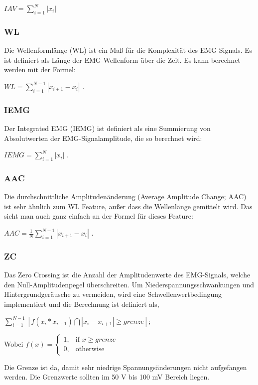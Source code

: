 $ IAV =  \sum_{i=1}^{N} \left | x_{i} \right | $ 

\subsubsection{WL}
Die Wellenformlänge (WL) ist ein Maß für die Komplexität des EMG Signals.
Es ist definiert als  Länge der EMG-Wellenform über die Zeit.
Es kann berechnet werden mit der Formel: 
 
 $WL =  \sum_{i=1}^{N-1}  \left | x_{i+1}-x_{i}  \right | $ .


\subsubsection{IEMG}
Der Integrated EMG (IEMG) ist definiert als eine Summierung von Absolutwerten der EMG-Signalamplitude, die so berechnet wird: 

$     IEMG = \sum_{i=1}^{N} \left | x_{i} \right | $ .

\subsubsection{AAC}
Die durchschnittliche Amplitudenänderung (Average Amplitude Change; AAC) ist sehr ähnlich zum WL Feature, außer dass die Wellenlänge gemittelt wird. Das sieht man auch ganz einfach an der Formel für dieses Feature: 

 $AAC =  \frac{1}{N}\sum_{i=1}^{N-1}  \left | x_{i+1}-x_{i}  \right | $ .

\subsubsection{ZC}
Das Zero Crossing ist die Anzahl der Amplitudenwerte des EMG-Signals, welche den Null-Amplitudenpegel überschreiten. Um Niederspannungsschwankungen und Hintergrundgeräusche zu vermeiden, wird eine Schwellenwertbedingung implementiert und die Berechnung ist definiert als,

$\sum_{i=1}^{N-1} \left [ f(x_{i} * x_{i+1}) \bigcap \left | x_{i} - x_{i+1} \right | \geq grenze \right ];$

Wobei $    f(x)= 
\begin{cases}
    1,& \text{if } x\geq grenze\\
    0,              & \text{otherwise}
\end{cases} $

Die Grenze ist da, damit sehr niedrige Spannungsänderungen nicht aufgefangen werden. Die Grenzwerte sollten im 50 \textmu V bis 100 mV Bereich liegen.

